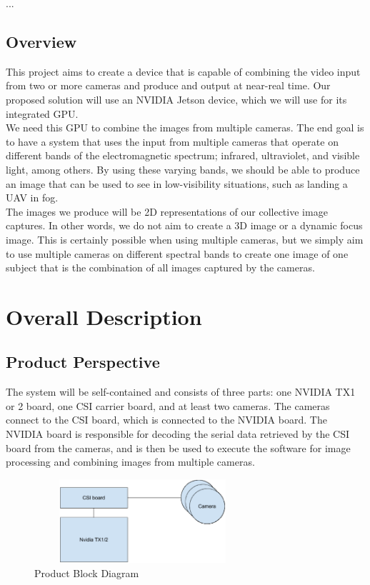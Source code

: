 \documentclass[letterpaper,10pt,serif,draftclsnofoot,onecolumn,compsoc,titlepage]{IEEEtran}
\begin{document}
...

\subsection{Overview}

This project aims to create a device that is capable of combining the video input from 
two or more cameras and produce and output at near-real time. Our proposed solution 
will use an NVIDIA Jetson device, which we will use for its integrated GPU.\\

We need this GPU to combine the images from multiple cameras. The end goal is to have 
a system that uses the input from multiple cameras that operate on different bands of 
the electromagnetic spectrum; infrared, ultraviolet, and visible light, among others. 
 By using these varying bands, we should be able to produce an image that can be used 
 to see in low-visibility situations, such as landing a UAV in fog.\\

The images we produce will be 2D representations of our collective image captures. In 
other words, we do not aim to create a 3D image or a dynamic focus image. This is 
certainly possible when using multiple cameras, but we simply aim to use multiple 
cameras on different spectral bands to create one image of one subject that is the 
combination of all images captured by the cameras.\\


\section{Overall Description}

\subsection{Product Perspective}

The system will be self-contained and consists of three parts: one NVIDIA TX1 or 2 board, 
one CSI carrier board, and at least two cameras. The cameras connect to the CSI board, 
which is connected to the NVIDIA board. The NVIDIA board is responsible for decoding 
the serial data retrieved by the CSI board from the cameras, and is then be used to 
execute the software for image processing and combining images from multiple cameras.\\

\begin{figure}[H]
	\centering
	\label{fig:CopyOnWriteBefore}
	\includegraphics[width=8cm,height=3.1cm]{images/block_diagram.eps}
	\caption{Product Block Diagram \label{overflow}}
\end{figure}
\end{document}
